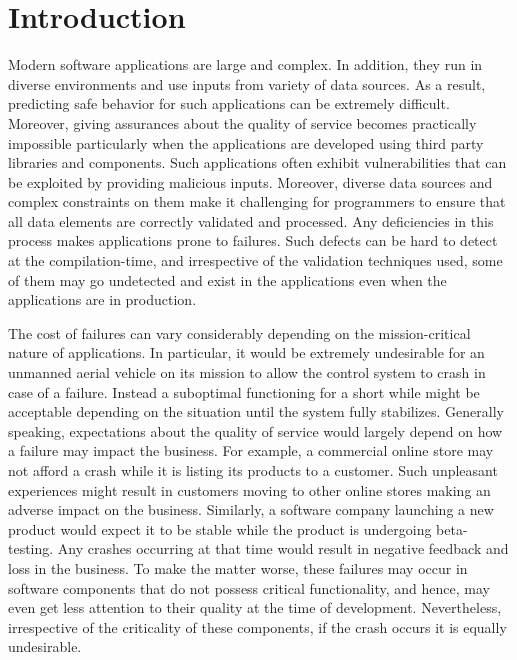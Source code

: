 \section{Introduction}
\label{sec:intro}



Modern software applications are large and complex. In addition, they run in
diverse environments and use inputs from variety of data sources. As a result,
predicting safe behavior for such applications can be extremely difficult.
Moreover, giving assurances about the quality of service becomes practically
impossible particularly when the applications are developed using third party
libraries and components. Such applications often exhibit vulnerabilities that
can be exploited by providing malicious inputs. Moreover, diverse data sources
and complex constraints on them make it challenging for programmers to ensure
that all data elements are correctly validated and processed. Any deficiencies
in this process makes applications prone to failures. Such defects can be hard
to detect at the compilation-time, and irrespective of the validation techniques
used, some of them may go undetected and exist in the applications even when the
applications are in production.

The cost of failures can vary considerably depending on the mission-critical
nature of applications. In particular, it would be extremely undesirable for an
unmanned aerial vehicle on its mission to allow the control system to crash in
case of a failure. Instead a suboptimal functioning for a short while might be
acceptable depending on the situation until the system fully stabilizes.
Generally speaking, expectations about the quality of service would largely
depend on how a failure may impact the business. For example, a commercial
online store may not afford a crash while it is listing its products to a
customer. Such unpleasant experiences might result in customers moving to other
online stores making an adverse impact on the business. Similarly, a software
company launching a new product would expect it to be stable while the product
is undergoing beta-testing. Any crashes occurring at that time would result in
negative feedback and loss in the business. To make the matter worse, these
failures may occur in software components that do not possess critical
functionality, and hence, may even get less attention to their quality at the
time of development. Nevertheless, irrespective of the criticality of these
components, if the crash occurs it is equally undesirable.

